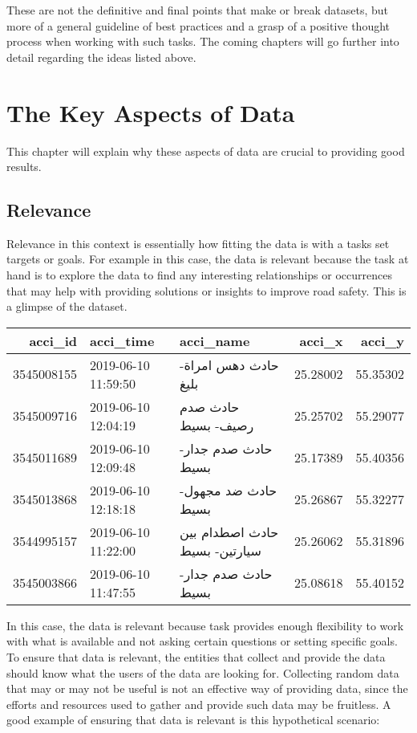 \documentclass[
]{book}
\begin{document}
These are not the definitive and final points that make or break datasets, but more of a general guideline of best practices and a grasp of a positive thought process when working with such tasks. The coming chapters will go further into detail regarding the ideas listed above.

\hypertarget{the-key-aspects-of-data}{%
\chapter{The Key Aspects of Data}\label{the-key-aspects-of-data}}

This chapter will explain why these aspects of data are crucial to providing good results.

\hypertarget{relevance}{%
\section{Relevance}\label{relevance}}

Relevance in this context is essentially how fitting the data is with a tasks set targets or goals. For example in this case, the data is relevant because the task at hand is to explore the data to find any interesting relationships or occurrences that may help with providing solutions or insights to improve road safety. This is a glimpse of the dataset.

\begin{tabular}{r|l|l|r|r}
\hline
acci\_id & acci\_time & acci\_name & acci\_x & acci\_y\\
\hline
3545008155 & 2019-06-10 11:59:50 & حادث دهس امراة- بليغ & 25.28002 & 55.35302\\
\hline
3545009716 & 2019-06-10 12:04:19 & حادث صدم رصيف- بسيط & 25.25702 & 55.29077\\
\hline
3545011689 & 2019-06-10 12:09:48 & حادث صدم جدار- بسيط & 25.17389 & 55.40356\\
\hline
3545013868 & 2019-06-10 12:18:18 & حادث ضد مجهول- بسيط & 25.26867 & 55.32277\\
\hline
3544995157 & 2019-06-10 11:22:00 & حادث اصطدام بين سيارتين- بسيط & 25.26062 & 55.31896\\
\hline
3545003866 & 2019-06-10 11:47:55 & حادث صدم جدار- بسيط & 25.08618 & 55.40152\\
\hline
\end{tabular}

In this case, the data is relevant because task provides enough flexibility to work with what is available and not asking certain questions or setting specific goals. To ensure that data is relevant, the entities that collect and provide the data should know what the users of the data are looking for. Collecting random data that may or may not be useful is not an effective way of providing data, since the efforts and resources used to gather and provide such data may be fruitless. A good example of ensuring that data is relevant is this hypothetical scenario:
\end{document}
